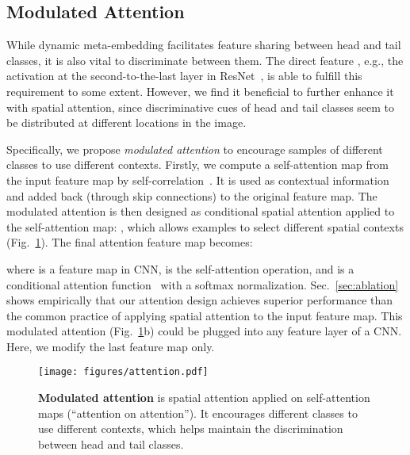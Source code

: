 \documentclass[10pt,twocolumn,letterpaper]{article}
\begin{document}
\subsection{Modulated Attention}
While {dynamic meta-embedding} facilitates feature sharing between head and tail classes, it is also vital to discriminate between them.  The  direct feature , e.g., the activation at the second-to-the-last layer in ResNet~\cite{he2016deep},
is able to fulfill this requirement to some extent. However, we find it beneficial to further enhance it with spatial attention, since discriminative cues of head and tail classes seem to be distributed at different locations in the image. 

Specifically, we propose \emph{modulated attention} to encourage samples of different classes to use different contexts.
Firstly, we compute a self-attention map  from the input feature map by self-correlation~\cite{wang2017non}.
It is used as contextual information and added back (through skip connections) to the original feature map. 
The {modulated attention}  is then designed as  conditional spatial attention applied to the self-attention map: , which allows examples to select different spatial contexts (Fig.~\ref{fig:attention}).  The final attention feature map becomes:

where  is a feature map in CNN,  is the self-attention operation, and  is a conditional attention function~\cite{vaswani2017attention} with a softmax normalization.
 Sec.~\ref{sec:ablation} shows empirically  that our attention design achieves superior performance than the common practice of applying spatial attention to the input feature map. This modulated attention (Fig.~\ref{fig:attention}b) could be plugged into any feature layer of a CNN. Here, we modify the last feature map only.



\begin{figure}[t]
  \centering
  \texttt{[image: figures/attention.pdf]}
  \caption{\textbf{Modulated attention} is spatial attention applied on self-attention maps (``attention on attention''). It encourages different classes to use different contexts, which helps maintain the discrimination between head and tail classes.}
  \label{fig:attention}
\end{figure}
\end{document}
